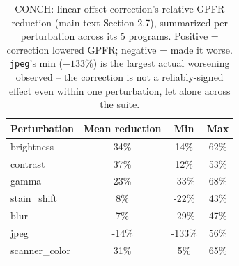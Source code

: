 \begin{table}[H]
\centering
\caption{CONCH: linear-offset correction's relative GPFR reduction (main text Section 2.7), summarized per perturbation across its 5 programs. Positive = correction lowered GPFR; negative = made it worse. \texttt{jpeg}'s min ($-133\%$) is the largest actual worsening observed -- the correction is not a reliably-signed effect even within one perturbation, let alone across the suite.}
\label{tab:fragility_decomposition}
\begin{tabular}{lccc}
\toprule
Perturbation & Mean reduction & Min & Max \\
\midrule
brightness & 34\% & 14\% & 62\% \\
contrast & 37\% & 12\% & 53\% \\
gamma & 23\% & -33\% & 68\% \\
stain\_shift & 8\% & -22\% & 43\% \\
blur & 7\% & -29\% & 47\% \\
jpeg & -14\% & -133\% & 56\% \\
scanner\_color & 31\% & 5\% & 65\% \\
\bottomrule
\end{tabular}
\end{table}
